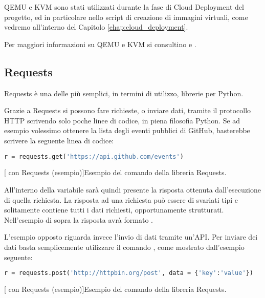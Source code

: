             \ac{QEMU} e \ac{KVM} sono stati utilizzati durante la fase di Cloud Deployment del progetto, ed in particolare nello script di creazione di immagini virtuali, come vedremo all'interno del Capitolo \ref{chap:cloud_deployment}.
            
            Per maggiori informazioni su \ac{QEMU} e \ac{KVM} si consultino \cite{kvm:wiki} e \cite{qemu:wiki}.
        
        \subsection{Requests} \label{subsec:p;sl;requests}
        
            Requests è una delle più semplici, in termini di utilizzo, librerie  per Python.
            
            Grazie a Requests si possono fare richieste, o inviare dati, tramite il protocollo \ac{HTTP} scrivendo solo poche linee di codice, in piena filosofia Python. Se ad esempio volessimo ottenere la lista degli eventi pubblici di GitHub, basterebbe scrivere la seguente linea di codice:
            
            \begin{center}
                \begin{lstlisting}[language=python, gobble=18]
                    r = requests.get('https://api.github.com/events')
                \end{lstlisting}
                \captionsetup{textformat=empty,labelformat=empty} \vspace{-2em}
                [ con Requests (esempio)]{Esempio del comando  della libreria Requests.}
            \end{center}
            
            All'interno della variabile  sarà quindi presente la risposta ottenuta dall'esecuzione di quella richiesta. La risposta ad una richiesta può essere di svariati tipi e solitamente contiene tutti i dati richiesti, opportunamente strutturati. Nell'esempio di sopra la risposta avrà formato .
            
            L'esempio opposto riguarda invece l'invio di dati tramite un'\ac{API}. Per inviare dei dati basta semplicemente utilizzare il comando , come mostrato dall'esempio seguente:
            
            \begin{center}
                \begin{lstlisting}[language=python, gobble=18]
                    r = requests.post('http://httpbin.org/post', data = {'key':'value'})
                \end{lstlisting}
                \captionsetup{textformat=empty,labelformat=empty} \vspace{-2em}
                [ con Requests (esempio)]{Esempio del comando  della libreria Requests.}
            \end{center}
            
